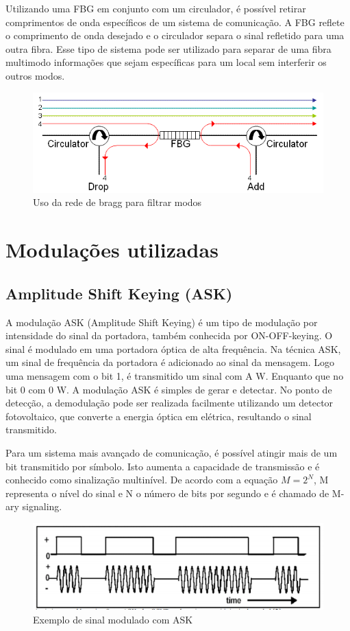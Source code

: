 \documentclass[article]{IEEEtran}
\begin{document}
Utilizando uma FBG em conjunto com um circulador, é possível retirar comprimentos de onda específicos de um sistema de comunicação. A FBG reflete o comprimento de onda desejado e o circulador separa o sinal refletido para uma outra fibra. Esse tipo de sistema pode ser utilizado para separar de uma fibra multimodo informações que sejam específicas para um local sem interferir os outros modos.
\begin{figure}[h]

\includegraphics[width=\columnwidth]{Fbg.png}
\caption{Uso da rede de bragg para filtrar modos}
\end{figure}


\section{Modulações utilizadas}
\subsection{Amplitude Shift Keying (ASK)}
\par A modulação ASK (Amplitude Shift Keying) é um tipo de modulação por intensidade do sinal da portadora, também conhecida por ON-OFF-keying. O sinal é modulado em uma portadora óptica de alta frequência. Na técnica ASK, um sinal de frequência da portadora é adicionado ao sinal da mensagem. Logo uma mensagem com o bit 1, é transmitido um sinal com A W. Enquanto que no bit 0 com 0 W. A modulação ASK é simples de gerar e detectar. No ponto de detecção, a demodulação pode ser realizada facilmente utilizando um detector fotovoltaico, que converte a energia óptica em elétrica, resultando o sinal transmitido.
\par	Para um sistema mais avançado de comunicação, é possível atingir mais de um bit transmitido por símbolo. Isto aumenta a capacidade de transmissão e é conhecido como sinalização multinível. De acordo com a equação $M = 2^N$, M representa o nível do sinal e N o número de bits por segundo e é chamado de M-ary signaling.\cite{MODULATION}
\begin{figure}[hb]
\includegraphics[width=\columnwidth]{ask.png}
\caption{Exemplo de sinal modulado com ASK}
\end{figure}
\end{document}
